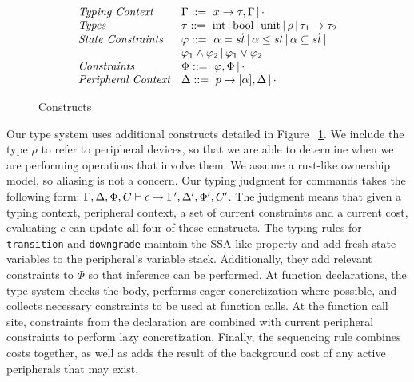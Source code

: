 \documentclass[sigconf, nonacm, screen]{acmart}
\begin{document}
\begin{figure}
\small
    \centering
\[
\begin{array}{llcl}
\textit{Typing Context} & \Gamma ::= \ x \rightarrow \tau, \Gamma \,|\, \cdot
\\ 
\textit{Types} & \tau ::= \ \text{int} \,|\, \text{bool} \,|\, \text{unit} \,|\, \rho \,|\, \tau_1 \rightarrow \tau_2 
\\
\textit{State Constraints} & \varphi ::= \ \alpha = \Vec{st} \,|\, \alpha \leq st \,|\, \alpha \subseteq \Vec{st} \,|\, \\ & \varphi_1 \wedge \varphi_2 \,|\, \varphi_1 \vee \varphi_2 \\
\textit{Constraints} & \Phi  ::= \ \varphi, \Phi \,|\, \cdot  \\
\textit{Peripheral Context} & \Delta ::= \  p \rightarrow [\alpha], \Delta \,|\, \cdot
\end{array}
\]
\vspace{-6pt}
\caption{Constructs}
\label{fig:constructs}
\end{figure}
Our type system uses additional constructs detailed in Figure ~\ref{fig:constructs}. We include the type $\rho$ to refer to peripheral devices, so that we are able to determine when we are performing operations that involve them. We assume a rust-like ownership model, so aliasing is not a concern. Our typing judgment for commands takes the following form: $\Gamma, \Delta, \Phi, C \vdash c \rightarrow \Gamma', \Delta', \Phi', C'$. The judgment means that given a typing context, peripheral context, a set of current constraints and a current cost, evaluating $c$ can update all four of these constructs. The typing rules for \texttt{transition} and \texttt{downgrade} maintain the SSA-like property and add fresh state variables to the peripheral's variable stack. Additionally, they add relevant constraints to $\Phi$ so that inference can be performed. At function declarations, the type system checks the body, performs eager concretization where possible, and collects necessary constraints to be used at function calls. At the function call site, constraints from the declaration are combined with current peripheral constraints to perform lazy concretization. Finally, the sequencing rule combines costs together, as well as adds the result of the background cost of any active peripherals that may exist. 
\end{document}
